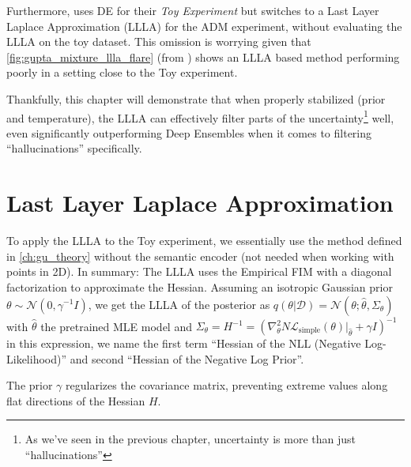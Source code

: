 Furthermore, \cite{jazbec_generative_2025} uses \acs{DE} for their \textit{Toy Experiment} but switches to a Last Layer Laplace Approximation (\acs{LLLA}) for the \acs{ADM} experiment, without evaluating the \acs{LLLA} on the toy dataset. This omission is worrying given that \autoref{fig:gupta_mixture_llla_flare} (from \cite{gupta_quantifying_2026}) shows an \acs{LLLA} based method performing poorly in a setting close to the Toy experiment.

Thankfully, this chapter will demonstrate that when properly stabilized (prior and temperature), the \acs{LLLA} can effectively filter parts of the uncertainty\footnote{As we've seen in the previous chapter, uncertainty is more than just ``hallucinations''} well, even significantly outperforming Deep Ensembles when it comes to filtering ``hallucinations'' specifically.

\section{Last Layer Laplace Approximation} 

To apply the \acs{LLLA} to the Toy experiment, we essentially use the method defined in \autoref{ch:gu_theory} without the semantic encoder (not needed when working with points in 2D). In summary: The \acs{LLLA} uses the Empirical \acs{FIM} with a diagonal factorization to approximate the Hessian. Assuming an isotropic Gaussian prior $\theta \sim \mathcal{N}(0, \gamma^{-1}I)$, we get the \acs{LLLA} of the posterior as $q(\theta|\mathcal{D})=\mathcal{N}(\theta;\hat\theta, \Sigma_\theta)$ with $\hat\theta$ the pretrained \acs{MLE} model and $\Sigma_\theta = H^{-1} = (\nabla^2_\theta N\mathcal{L}_{\mathrm{simple}}(\theta)|_{\hat\theta} + \gamma I)^{-1}$ in this expression, we name the first term ``Hessian of the \acs{NLL} (Negative Log-Likelihood)'' and second ``Hessian of the Negative Log Prior''.

The prior $\gamma$ regularizes the covariance matrix, preventing extreme values along flat directions of the Hessian $H$.


